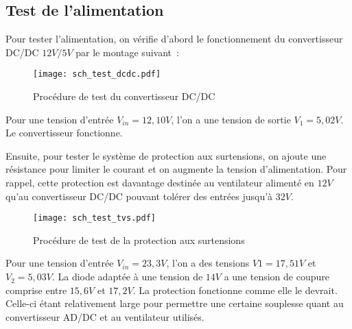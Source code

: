 \subsection{Test de l'alimentation} %

Pour tester l'alimentation, on vérifie d'abord le fonctionnement du convertisseur DC/DC $12V/5V$ par le montage suivant~:

\begin{figure}[H]
    \centering
    \texttt{[image: sch\_test\_dcdc.pdf]}
    \decoRule
    \caption[
    Procédure de test du convertisseur DC/DC]{
    Procédure de test du convertisseur DC/DC}
    \label{fig:Procédure de test du convertisseur DC/DC}
	\end{figure}

\vspace{1cm}

Pour une tension d'entrée $V_{in}=12,10V$, l'on a une tension de sortie $V_{1}=5,02V$. Le convertisseur fonctionne.

\vspace{1cm}

Ensuite, pour tester le système de protection aux surtensions, on ajoute une résistance pour limiter le courant et on augmente la tension d'alimentation. Pour rappel, cette protection est davantage destinée au ventilateur alimenté en $12V$ qu'au convertisseur DC/DC pouvant tolérer des entrées jusqu'à $32V$.

\begin{figure}[H]
    \centering
    \texttt{[image: sch\_test\_tvs.pdf]}
    \decoRule
    \caption[
    Procédure de test de la protection aux surtensions]{
    Procédure de test de la protection aux surtensions}
    \label{fig:Procédure de test de la protection aux surtensions}
	\end{figure}

\vspace{1cm}

Pour une tension d'entrée $V_{in}=23,3V$, l'on a des tensions $V{1}=17,51V$ et $V_{2}=5,03V$. La diode adaptée à une tension de $14V$ a une tension de coupure comprise entre $15,6V$ et $17,2V$. La protection fonctionne comme elle le devrait. Celle-ci étant relativement large pour permettre une certaine souplesse quant au convertisseur AD/DC et au ventilateur utilisés.

